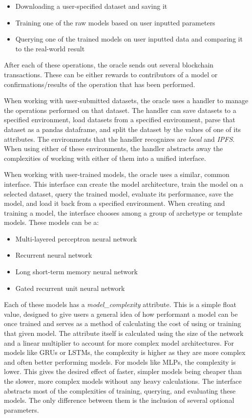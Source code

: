 \documentclass{ledger}
\begin{document}
\begin{itemize}
    \item Downloading a user-specified dataset and saving it
    \item Training one of the raw models based on user inputted parameters
    \item Querying one of the trained models on user inputted data and comparing it to the real-world result
\end{itemize}

After each of these operations, the oracle sends out several blockchain transactions.  These can be either
rewards to contributors of a model or confirmations/results of the operation that has been performed.

When working with user-submitted datasets, the oracle uses a handler to manage the operations performed on that dataset.
The handler can save datasets to a specified environment, load datasets from a specified environment, parse that dataset
as a pandas dataframe, and split the dataset by the values of one of its attributes.  The environments that the handler
recognizes are \textit{local} and \textit{IPFS}.  When using either of these environments, the handler abstracts away the
complexities of working with either of them into a unified interface.

When working with user-trained models, the oracle uses a similar, common interface.  This interface can create the model
architecture, train the model on a selected dataset, query the trained model, evaluate its performance, save the model,
and load it back from a specified environment.  When creating and training a model, the interface chooses among a group
of archetype or template models.  These models can be a:

\begin{itemize}
    \item Multi-layered perceptron neural network
    \item Recurrent neural network
    \item Long short-term memory neural network
    \item Gated recurrent unit neural network
\end{itemize}

Each of these models has a \textit{model\_complexity} attribute.  This is a simple float value, designed to give users
a general idea of how performant a model can be once trained and serves as a method of calculating the cost of using
or training that given model.  The attribute itself is calculated using the size of the network and a linear multiplier to
account for more complex model architectures.  For models like GRUs or LSTMs, the complexity is higher as they are more complex and often
better performing models.  For models like MLPs, the complexity is lower.  This gives the desired effect of faster, simpler
models being cheaper than the slower, more complex models without any heavy calculations.   The interface abstracts most
of the complexities of training, querying, and evaluating these models.  The only difference between them is the inclusion
of several optional parameters.
\end{document}
